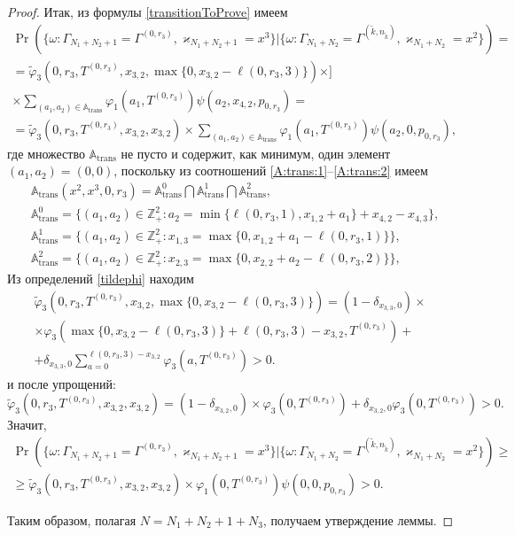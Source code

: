 \documentclass{report}
\begin{document}
\begin{proof}
Итак, из формулы \eqref{transitionToProve} имеем
\begin{multline*}
\Pr(\{\omega\colon \Gamma_{N_1+N_2+1}=\Gamma^{(0,r_3)}, \varkappa_{N_1+N_2+1}=x^{3}\}|\{\omega\colon 
\Gamma_{N_1+N_2}=\Gamma^{(\tilde{k},n_{\tilde{k}})}, \varkappa_{N_1+N_2}=x^2\})=\\
=\widetilde{\varphi}_3(0,r_3,T^{(0,r_3)},x_{3,2},\max{\{0,x_{3,2} - \ell(0,r_3,3)\}}) \times]\\ \times
\sum_{(a_1,a_2)\in {\mathbb A}_{\mathrm{trans}}}\varphi_1(a_1,T^{(0,r_3)})  \psi(a_2,x_{4,2}, p_{0,r_3}) =\\
=\widetilde{\varphi}_3(0,r_3,T^{(0,r_3)},x_{3,2},x_{3,2}) \times
\sum_{(a_1,a_2)\in {\mathbb A}_{\mathrm{trans}}}\varphi_1(a_1,T^{(0,r_3)})  \psi(a_2,0, p_{0,r_3}),
\end{multline*}
где множество ${\mathbb A}_{\mathrm{trans}}$ не пусто и содержит, как минимум, один элемент $(a_1,a_2)=(0,0)$, поскольку из соотношений \eqref{A:trans:1}--\eqref{A:trans:2} имеем
\begin{align*}
&{\mathbb A}_{\mathrm{trans}}(x^2,x^{3},0,r_3) = {\mathbb A}_{\mathrm{trans}}^0 \bigcap {\mathbb A}_{\mathrm{trans}}^1\bigcap {\mathbb A}_{\mathrm{trans}}^2,\\
&{\mathbb A}_{\mathrm{trans}}^0 = \{(a_1,a_2) \in \mathbb{Z}_+^2 \colon a_2 = \min{\{\ell(0,r_3,1), x_{1,2}+a_1}\} +x_{4,2}- x_{4,3}\},\\
&{\mathbb A}_{\mathrm{trans}}^1 = \{(a_1,a_2) \in \mathbb{Z}_+^2 \colon x_{1,3}=\max{\{0,x_{1,2}+a_1-\ell(0,r_3,1)\}}\},\\
& {\mathbb A}_{\mathrm{trans}}^2 = \{(a_1,a_2) \in \mathbb{Z}_+^2 \colon  x_{2,3} =\max{\{0,x_{2,2}+a_2-\ell(0,r_3,2)\}}\},
\end{align*}
Из определений \eqref{tildephi} находим
\begin{multline*}
\widetilde{\varphi}_3(0,r_3,T^{(0,r_3)},x_{3,2},\max{\{0,x_{3,2} - \ell(0,r_3,3)\}})= (1-\delta_{x_{3,3},0}) \times \\\times\varphi_3(\max{\{0,x_{3,2} - \ell(0,r_3,3)\}} + \ell (0,r_3,3) - x_{3,2},T^{(0,r_3)} ) 
+\\+\delta_{x_{3,3},0} \sum_{a=0}^{\ell(0,r_3,3)-x_{3,2}}\varphi_3 (a,T^{(0,r_3)})>0.
\end{multline*}
и после упрощений:
\begin{equation*}
\widetilde{\varphi}_3(0,r_3,T^{(0,r_3)},x_{3,2},x_{3,2})= (1-\delta_{x_{3,2},0}) \times \varphi_3(0,T^{(0,r_3)} ) 
+\delta_{x_{3,2},0} \varphi_3 (0,T^{(0,r_3)})>0.
\end{equation*}
Значит,
\begin{multline*}
\Pr(\{\omega\colon \Gamma_{N_1+N_2+1}=\Gamma^{(0,r_3)}, \varkappa_{N_1+N_2+1}=x^{3}\}|\{\omega\colon 
\Gamma_{N_1+N_2}=\Gamma^{(\tilde{k},n_{\tilde{k}})}, \varkappa_{N_1+N_2}=x^2\})\geqslant \\
\geqslant \widetilde{\varphi}_3(0,r_3,T^{(0,r_3)},x_{3,2},x_{3,2})
\times
\varphi_1(0,T^{(0,r_3)})  \psi(0,0, p_{0,r_3}) > 0.
\end{multline*}

Таким образом, полагая $N=N_1+N_2+1+N_3$, получаем утверждение леммы.
\end{proof}
\end{document}
